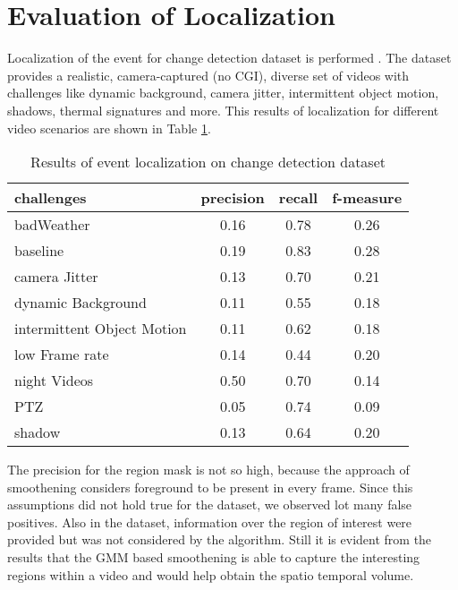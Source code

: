 \section{Evaluation of Localization}
Localization of the event for change detection dataset \citep{cdnet} is performed . The dataset provides  a realistic, camera-captured (no CGI), diverse set of videos with challenges  like dynamic background, camera jitter, intermittent object motion, shadows, thermal signatures and more. This results of localization for different video scenarios are shown in Table \ref{tab:evalLoc}.

\begin{table}[htbp]
   \caption{Results of event localization on change detection dataset}
   \begin{center}
   \begin{tabular}{|l|c|c|c|} \hline
        \textbf{challenges} & \textbf{precision} & \textbf{recall} & \textbf{f-measure} \\ \hline
		badWeather & 0.16 & 0.78 & 0.26\\
		baseline & 0.19 & 0.83 & 0.28\\
		camera Jitter & 0.13 & 0.70 & 0.21 \\
		dynamic Background & 0.11 & 0.55 &  0.18\\
		intermittent Object Motion & 0.11 & 0.62 & 0.18 \\
		low Frame rate & 0.14 & 0.44 & 0.20 \\
		night Videos & 0.50 & 0.70 & 0.14 \\
		PTZ & 0.05 & 0.74 & 0.09\\
		shadow & 0.13 & 0.64 & 0.20\\ \hline
   \end{tabular}
   \label{tab:evalLoc}
   \end{center}
 \end{table} 
\par The precision for the region mask is not so high, because the approach of smoothening considers foreground to be present in every frame. Since this assumptions did not hold true for the dataset, we observed lot many false positives.  Also in the dataset, information over the region of interest were provided but was not considered by the algorithm. Still it is evident from the results that the GMM based smoothening is able to capture the interesting regions within a video and would help obtain the spatio temporal volume.

